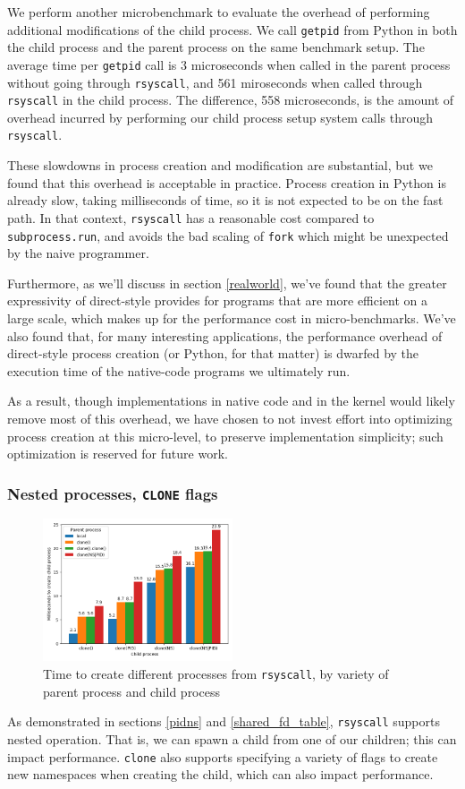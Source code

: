 \documentclass[letterpaper,twocolumn,10pt]{article}
\begin{document}
We perform another microbenchmark to evaluate the overhead of performing additional modifications of the child process.
We call \texttt{getpid} from Python
in both the child process and the parent process on the same benchmark setup.
The average time per \texttt{getpid} call is
3 microseconds when called in the parent process without going through \texttt{rsyscall},
and 561 miroseconds when called through \texttt{rsyscall} in the child process.
The difference, 558 microseconds,
is the amount of overhead incurred
by performing our child process setup system calls through \texttt{rsyscall}.

These slowdowns in process creation and modification are substantial,
but we found that this overhead is acceptable in practice.
Process creation in Python is already slow, taking milliseconds of time,
so it is not expected to be on the fast path.
In that context, \texttt{rsyscall} has a reasonable cost compared to \texttt{subprocess.run},
and avoids the bad scaling of \texttt{fork} which might be unexpected by the naive programmer.

Furthermore, as we'll discuss in section \ref{realworld},
we've found that the greater expressivity of direct-style
provides for programs that are more efficient on a large scale,
which makes up for the performance cost in micro-benchmarks.
We've also found that, for many interesting applications,
the performance overhead of direct-style process creation (or Python, for that matter)
is dwarfed by the execution time of the native-code programs we ultimately run.

As a result, though implementations in native code and in the kernel would likely remove most of this overhead,
we have chosen to not invest effort into optimizing process creation at this micro-level,
to preserve implementation simplicity;
such optimization is reserved for future work.
\subsubsection{Nested processes, \texttt{CLONE} flags}\label{clone_bench}
\begin{figure}
\centering
 \includegraphics[width=0.5\textwidth]{clone_bench}
 \caption{Time to create different processes from \texttt{rsyscall}, by variety of parent process and child process}
 \label{fig:clone_bench}
\end{figure}
As demonstrated in sections \ref{pidns} and \ref{shared_fd_table},
\texttt{rsyscall} supports nested operation.
That is, we can spawn a child from one of our children;
this can impact performance.
\texttt{clone} also supports specifying a variety of flags to create new namespaces when creating the child,
which can also impact performance.
\end{document}
